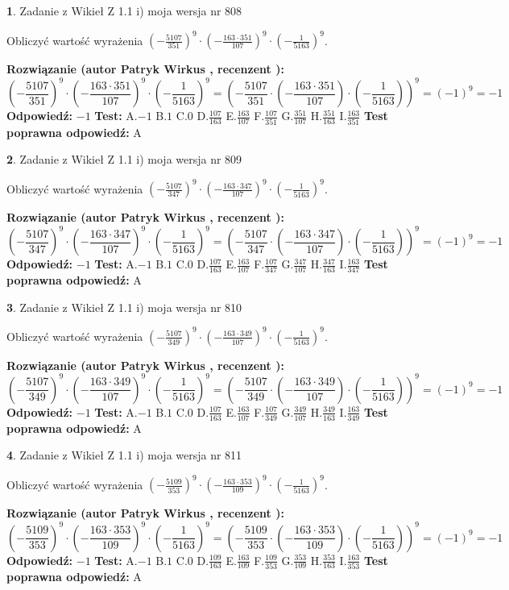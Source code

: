 \documentclass[12pt, a4paper]{article}
\theoremstyle{definition} %
\newtheorem{zad}{}
\newcommand{\zadStart}[1]{\begin{zad}#1\newline}
\newcommand{\zadStop}{\end{zad}}
\newcommand{\rozwStart}[2]{\noindent \textbf{Rozwiązanie (autor #1 , recenzent #2): }\newline}
\newcommand{\rozwStop}{\newline}
\newcommand{\odpStart}{\noindent \textbf{Odpowiedź:}\newline}
\newcommand{\odpStop}{\newline}
\newcommand{\testStart}{\noindent \textbf{Test:}\newline}
\newcommand{\testStop}{\newline}
\newcommand{\kluczStart}{\noindent \textbf{Test poprawna odpowiedź:}\newline}
\newcommand{\kluczStop}{\newline}
\begin{document}
\zadStart{Zadanie z Wikieł Z 1.1 i) moja wersja nr 808}

Obliczyć wartość wyrażenia $(-\frac{5107}{351})^{9} \cdot (-\frac{163 \cdot 351}{107})^{9} \cdot (-\frac{1}{5163})^{9}$.
\zadStop
\rozwStart{Patryk Wirkus}{}
$$(-\frac{5107}{351})^{9} \cdot (-\frac{163 \cdot 351}{107})^{9} \cdot (-\frac{1}{5163})^{9} = (-\frac{5107}{351} \cdot (-\frac{163 \cdot 351}{107}) \cdot (-\frac{1}{5163}))^{9} = (-1)^{9} = -1$$
\rozwStop
\odpStart
$-1$
\odpStop
\testStart
A.$-1$ B.$1$ C.$0$ D.$\frac{107}{163}$ E.$\frac{163}{107}$
F.$\frac{107}{351}$ G.$\frac{351}{107}$
H.$\frac{351}{163}$
I.$\frac{163}{351}$
\testStop
\kluczStart
A
\kluczStop



\zadStart{Zadanie z Wikieł Z 1.1 i) moja wersja nr 809}

Obliczyć wartość wyrażenia $(-\frac{5107}{347})^{9} \cdot (-\frac{163 \cdot 347}{107})^{9} \cdot (-\frac{1}{5163})^{9}$.
\zadStop
\rozwStart{Patryk Wirkus}{}
$$(-\frac{5107}{347})^{9} \cdot (-\frac{163 \cdot 347}{107})^{9} \cdot (-\frac{1}{5163})^{9} = (-\frac{5107}{347} \cdot (-\frac{163 \cdot 347}{107}) \cdot (-\frac{1}{5163}))^{9} = (-1)^{9} = -1$$
\rozwStop
\odpStart
$-1$
\odpStop
\testStart
A.$-1$ B.$1$ C.$0$ D.$\frac{107}{163}$ E.$\frac{163}{107}$
F.$\frac{107}{347}$ G.$\frac{347}{107}$
H.$\frac{347}{163}$
I.$\frac{163}{347}$
\testStop
\kluczStart
A
\kluczStop



\zadStart{Zadanie z Wikieł Z 1.1 i) moja wersja nr 810}

Obliczyć wartość wyrażenia $(-\frac{5107}{349})^{9} \cdot (-\frac{163 \cdot 349}{107})^{9} \cdot (-\frac{1}{5163})^{9}$.
\zadStop
\rozwStart{Patryk Wirkus}{}
$$(-\frac{5107}{349})^{9} \cdot (-\frac{163 \cdot 349}{107})^{9} \cdot (-\frac{1}{5163})^{9} = (-\frac{5107}{349} \cdot (-\frac{163 \cdot 349}{107}) \cdot (-\frac{1}{5163}))^{9} = (-1)^{9} = -1$$
\rozwStop
\odpStart
$-1$
\odpStop
\testStart
A.$-1$ B.$1$ C.$0$ D.$\frac{107}{163}$ E.$\frac{163}{107}$
F.$\frac{107}{349}$ G.$\frac{349}{107}$
H.$\frac{349}{163}$
I.$\frac{163}{349}$
\testStop
\kluczStart
A
\kluczStop



\zadStart{Zadanie z Wikieł Z 1.1 i) moja wersja nr 811}

Obliczyć wartość wyrażenia $(-\frac{5109}{353})^{9} \cdot (-\frac{163 \cdot 353}{109})^{9} \cdot (-\frac{1}{5163})^{9}$.
\zadStop
\rozwStart{Patryk Wirkus}{}
$$(-\frac{5109}{353})^{9} \cdot (-\frac{163 \cdot 353}{109})^{9} \cdot (-\frac{1}{5163})^{9} = (-\frac{5109}{353} \cdot (-\frac{163 \cdot 353}{109}) \cdot (-\frac{1}{5163}))^{9} = (-1)^{9} = -1$$
\rozwStop
\odpStart
$-1$
\odpStop
\testStart
A.$-1$ B.$1$ C.$0$ D.$\frac{109}{163}$ E.$\frac{163}{109}$
F.$\frac{109}{353}$ G.$\frac{353}{109}$
H.$\frac{353}{163}$
I.$\frac{163}{353}$
\testStop
\kluczStart
A
\kluczStop
\end{document}
